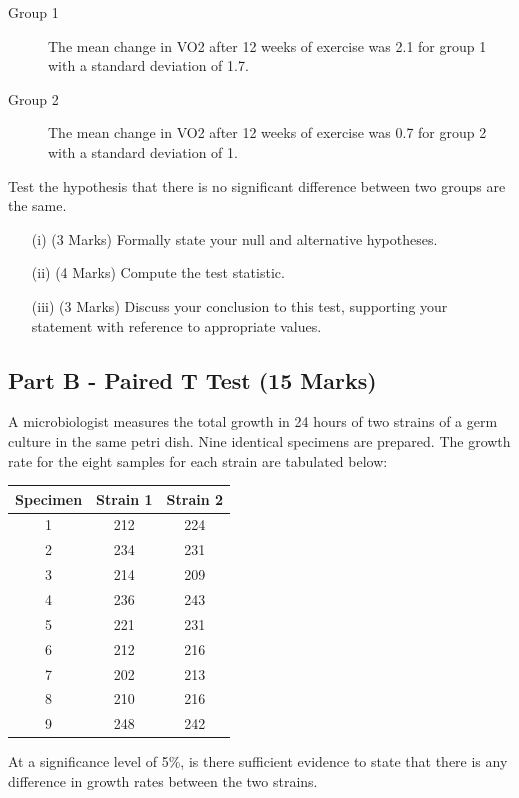 \documentclass[a4paper,12pt]{article}
\begin{document}
\begin{description}
	\item[Group 1] The mean change in VO2 after 12 weeks of exercise was 2.1 for group 1 with a standard deviation of 1.7.
	\item[Group 2] The mean change in VO2 after 12 weeks of exercise was 0.7 for group 2 with a standard deviation of 1. 
\end{description}

\noindent Test the hypothesis that there is no significant difference between two groups are the same.
	
\begin{itemize}
	\item[(i)](3 Marks) Formally state your null and alternative hypotheses.
	\item[(ii)](4 Marks) Compute the test statistic.
	\item[(iii)](3 Marks) Discuss your conclusion to this test, supporting your statement with reference to appropriate values.
\end{itemize}
\subsection*{Part B - Paired T Test (15 Marks)} %
A microbiologist measures the total growth in 24 hours of two strains of a germ culture  in the same petri dish. Nine identical specimens are prepared. The growth rate for the eight samples for each strain are tabulated below:

\begin{center}
	\begin{tabular}{|c|c|c|} \hline 
		Specimen &	Strain 1	&	Strain 2	\\ \hline \hline
		1 & 212 & 224 \\ \hline
		2 & 234 & 231 \\ \hline
		3 & 214 & 209 \\ \hline
		4 & 236 & 243 \\ \hline
		5 & 221 & 231 \\ \hline 
		6 & 212 & 216 \\ \hline
		7 & 202 & 213 \\ \hline 
		8 & 210 & 216 \\ \hline
		9 & 248 & 242 \\ \hline
	\end{tabular} 
\end{center}
\noindent At a significance level of 5\%, is there sufficient evidence to state that there is any difference in growth rates between the two strains.
\end{document}
